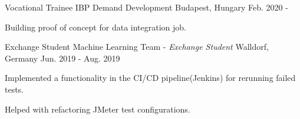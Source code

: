 \begin{cventries}
  \cventry
    {Vocational Trainee} %
    {IBP Demand Development} %
    {Budapest, Hungary} %
    {Feb. 2020 - } %
    {
      \begin{cvitems} %
        \item {Building proof of concept for data integration job.}
      \end{cvitems}
    }

  \cventry
    {Exchange Student} %
    {Machine Learning Team - \textit{Exchange Student}} %
    {Walldorf, Germany} %
    {Jun. 2019 - Aug. 2019} %
    {
      \begin{cvitems} %
        \item {Implemented a functionality in the CI/CD pipeline(Jenkins) for rerunning failed tests.}
        \item {Helped with refactoring JMeter test configurations.}
      \end{cvitems}
    }

\end{cventries}
